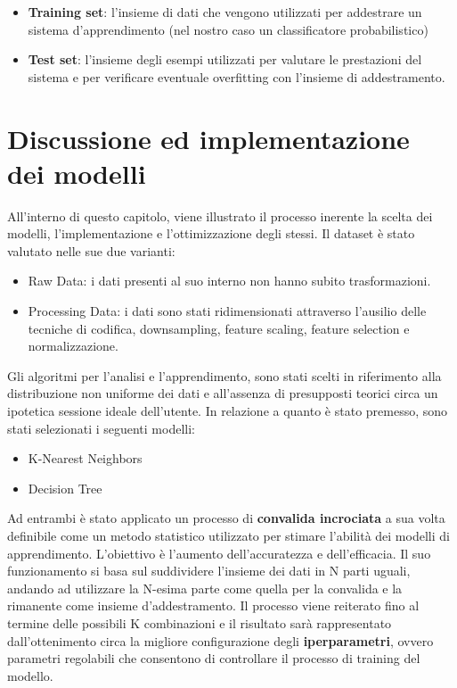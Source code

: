 \documentclass[10pt,a4paper]{article}
\begin{document}
\begin{itemize}
    \item \textbf{Training set}: l'insieme di dati che vengono utilizzati per addestrare un sistema d'apprendimento (nel nostro caso un classificatore probabilistico)
\end{itemize}

\begin{itemize}
    \item \textbf{Test set}: l'insieme degli esempi utilizzati per valutare le prestazioni del  sistema e per verificare eventuale overfitting con l'insieme di addestramento.
\end{itemize}
\clearpage

\section{Discussione ed implementazione dei modelli }

All'interno di questo capitolo, viene illustrato il processo inerente la scelta dei modelli, l'implementazione e l'ottimizzazione degli stessi.
\hfill \break
Il dataset è stato valutato nelle sue due varianti:
\begin{itemize}
    \item Raw Data: i dati presenti al suo interno non hanno subito trasformazioni.
\end{itemize}
\begin{itemize}
    \item Processing Data: i dati sono stati ridimensionati attraverso l'ausilio delle tecniche di codifica, downsampling, feature scaling, feature selection e normalizzazione.
\end{itemize}

Gli algoritmi per l'analisi e l'apprendimento, sono stati scelti in riferimento alla distribuzione non uniforme dei dati e all'assenza di presupposti teorici circa un ipotetica sessione ideale dell'utente.
In relazione a quanto è stato premesso, sono stati selezionati i seguenti modelli:
\begin{itemize}
    \item K-Nearest Neighbors
\end{itemize}
\begin{itemize}
    \item Decision Tree
\end{itemize}

Ad entrambi è stato applicato un processo di \textbf{convalida incrociata} a sua volta definibile come un metodo statistico utilizzato per stimare l’abilità dei modelli di apprendimento.\hfill \break
L'obiettivo è l'aumento dell'accuratezza e dell'efficacia.\hfill \break
Il suo funzionamento si basa sul suddividere l'insieme dei dati in N parti uguali, andando ad utilizzare la N-esima parte come quella per la convalida e la rimanente come insieme d'addestramento.\hfill \break
Il processo viene reiterato fino al termine delle possibili K combinazioni e il risultato sarà rappresentato dall'ottenimento circa la migliore configurazione degli \textbf{iperparametri}, ovvero parametri regolabili che consentono di controllare il processo di training del modello.
\end{document}
